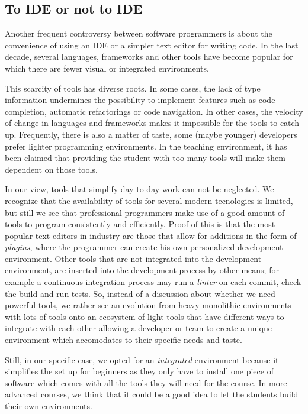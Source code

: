 \subsection{To IDE or not to IDE}
Another frequent controversy between software programmers is about the convenience of using an IDE or a simpler text editor for writing code. In the last decade, several languages, frameworks and other tools have become popular for which there are fewer visual or integrated environments. 

This scarcity of tools has diverse roots. In some cases, the lack of type information undermines the possibility to implement features such as code completion, automatic refactorings or code navigation.
In other cases, the velocity of change in languages and frameworks makes it impossible for the tools to catch up.
Frequently, there is also a matter of taste, some (maybe younger) developers prefer lighter programming environments.
In the teaching environment, it has been claimed that providing the student with too many tools will make them dependent on those tools.

In our view, tools that simplify day to day work can not be neglected. We recognize that the availability of tools for several modern tecnologies is limited, but still we see that professional programmers make use of a good amount of tools to program consistently and efficiently.
Proof of this is that the most popular text editors in industry are those that allow for additions in the form of \emph{plugins}, where the programmer can create his own personalized development environment.
Other tools that are not integrated into the development environment, are inserted into the development process by other means; for example a continuous integration process may run a \emph{linter} on each commit, check the build and run tests.
So, instead of a discussion about whether we need powerful tools, we rather see an evolution from heavy monolithic environments with lots of tools onto an ecosystem of light tools that have different ways to integrate with each other allowing a developer or team to create a unique environment which accomodates to their specific needs and taste. 

Still, in our specific case, we opted for an \emph{integrated} environment because it simplifies the set up for beginners as they only have to install one piece of software which comes with all the tools they will need for the course. In more advanced courses, we think that it could be a good idea to let the students build their own environments.

